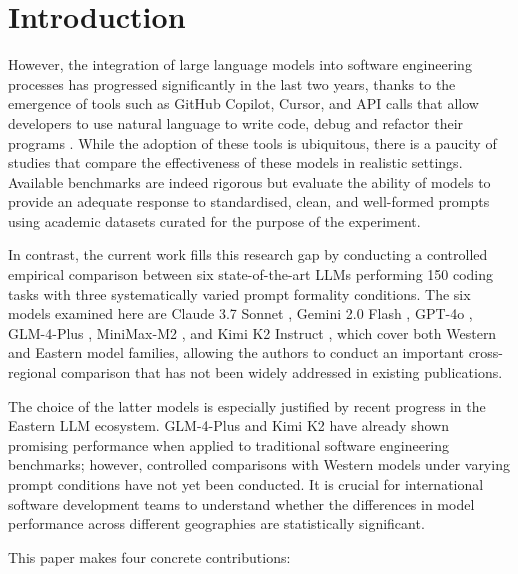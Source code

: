 \documentclass[conference]{IEEEtran}
\begin{document}
\section{Introduction}
\label{sec:intro}

However, the integration of large language models into software engineering processes has progressed significantly in the last two years, thanks to the emergence of tools such as GitHub Copilot, Cursor, and API calls that allow developers to use natural language to write code, debug and refactor their programs \cite{chen2021codex, austin2021mbpp}. While the adoption of these tools is ubiquitous, there is a paucity of studies that compare the effectiveness of these models in realistic settings. Available benchmarks are indeed rigorous but evaluate the ability of models to provide an adequate response to standardised, clean, and well-formed prompts using academic datasets curated for the purpose of the experiment.

In contrast, the current work fills this research gap by conducting a controlled empirical comparison between six state-of-the-art LLMs performing 150 coding tasks with three systematically varied prompt formality conditions. The six models examined here are Claude 3.7 Sonnet \cite{anthropic2025claude37}, Gemini 2.0 Flash \cite{google2024gemini20}, GPT-4o \cite{openai2024gpt4o}, GLM-4-Plus 
\cite{zeng2024chatglm}, MiniMax-M2 \cite{minimax2025m2}, and Kimi K2 Instruct \cite{kimiteam2025k2}, which cover both Western and Eastern model families, allowing the authors to conduct an important cross-regional comparison that has not been widely addressed in existing publications.

The choice of the latter models is especially justified by recent progress in the Eastern LLM ecosystem. GLM-4-Plus and Kimi K2 have already shown promising performance when applied to traditional software engineering benchmarks; however, controlled comparisons with Western models under varying prompt conditions have not 
yet been conducted. It is crucial for international software development teams to understand whether the differences in model performance across different geographies are statistically significant.

This paper makes four concrete contributions:
\end{document}
